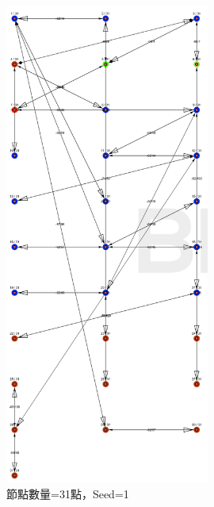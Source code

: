 \begin{ZhChapter}
\begin{figure}[H]
    \centering
    \includegraphics[width = 0.6\textwidth]{image/模擬實驗31點seed=1.png}
    \caption{節點數量=31點，Seed=1}
    \label{fig: 模擬實驗31點seed=1}
\end{figure}


\end{ZhChapter}
